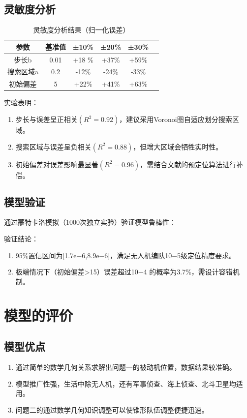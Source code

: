 \documentclass[withoutpreface,bwprint]{cumcmthesis} %
\begin{document}
\subsection{灵敏度分析}


\begin{table}[htbp]
    \centering
    \caption{灵敏度分析结果（归一化误差）}
    \label{tab:sensitivity}
    \begin{tabular}{c c c c c c}
    \toprule
    参数 & 基准值 & ±10\% & ±20\% & ±30\% \\
    \midrule
    步长b & 0.01 & +18 \% & +37\% & +59\% \\
    搜索区域a & 0.2 & -12\% & -24\% & -33\% \\
    初始偏差 & 5 & +22\% & +41\% & +63\% \\
    \bottomrule
    \end{tabular}
\end{table}

实验表明：

\begin{enumerate}
    \item 步长与误差呈正相关$(R^2=0.92)$，建议采用Voronoi图自适应划分搜索区域。
    \item 搜索区域与误差呈负相关$(R^2=0.88)$，但增大区域会牺牲实时性。
    \item 初始偏差对误差影响最显著$(R^2=0.96)$，需结合文献的预定位算法进行补偿。
\end{enumerate}



\subsection{模型验证}
通过蒙特卡洛模拟（1000次独立实验）验证模型鲁棒性：

验证结论：
    \begin{enumerate}
        \item 95\%置信区间为[1.7e−6,8.9e−6]，满足无人机编队10−5级定位精度要求。
        \item 极端情况下（初始偏差>15）误差超过10−4 的概率为3.7\%，需设计容错机制。
    \end{enumerate}


\section{模型的评价}
\subsection{模型优点}
\begin{enumerate}
    \item 通过简单的数学几何关系求解出问题一的被动机位置，数据结果较准确。
    \item 模型推广性强，生活中除无人机，还有军事侦查、海上侦查、北斗卫星均适用。
    \item 问题二的通过数学几何知识调整可以使锥形队伍调整便捷迅速。
\end{enumerate}
\end{document}
